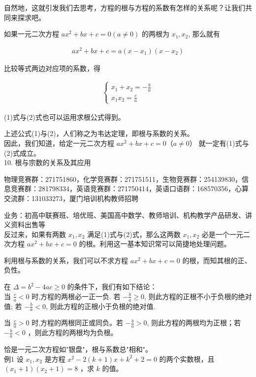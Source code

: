 \documentclass[10pt]{article}
\begin{document}
自然地，这就引发我们去思考，方程的根与方程的系数有怎样的关系呢？让我们共同来探求吧。

如果一元二次方程 $a x^{2}+b x+c=0(a \neq 0)$ 的两根为 $x_{1}, x_{2}$, 那么就有

\begin{align*}
a x^{2}+b x+c=a\left(x-x_{1}\right)\left(x-x_{2}\right)
\end{align*}

比较等式两边对应项的系数，得

\begin{align*}
\left\{\begin{array}{l}
x_{1}+x_{2}=-\frac{b}{a}  \tag{1}\\
x_{1} x_{2}=\frac{c}{a}
\end{array}\right.
\end{align*}

(1)式与(2)式也可以运用求根公式得到。

上述公式(1)与(2)，人们称之为韦达定理，即根与系数的关系。\\
因此，我们知道，给定一元二次方程 $a x^{2}+b x+c=0（a \neq 0）$ 就一定有(1)式与(2)式成立。\\
10. 根与宗数的关系及其应用

物理竞赛群：271751860，化学竞赛群：271751511，生物竞赛群：254139830，信息竞赛群：281798334，英语竞赛群：271750414，英语口语群：168570356，心算交流群：131033273，厦门培训机构教师招聘

业务：初高中联赛班、培优班、美国高中数学、教师培训、机构教学产品研发、讲义资料出售等\\
反过来，如果有两数 $x_{1}, x_{2}$ 满足(1)式与(2)式，那么这两数 $x_{1}, x_{2}$ 必是一个一元二次方程 $a x^{2}+b x+c=0$ 的根。利用这一基本知识常可以简捷地处理问题。

利用根与系数的关系，我们可以不求方程 $a x^{2}+b x+c=0$ 的根，而知其根的正、负性。

在 $\Delta=b^{2}-4 a c \geqslant 0$ 的条件下，我们有如下结论：\\
当 $\frac{c}{a}<0$ 时,方程的两根必一正一负. 若 $-\frac{b}{a} \geqslant 0$, 则此方程的正根不小于负根的绝对值; 若 $-\frac{b}{a}<0$, 则此方程的正根小于负根的绝对值.

当 $\frac{c}{a}>0$ 时,方程的两根同正或同负。若 $-\frac{b}{a}>0$, 则此方程的两根均为正根；若 $-\frac{b}{a}<0$ ，则此方程的两根均为负根。

恰是一元二次方程如"银盘"，根与系数总"相和"。\\
例1 设 $x_{1}, x_{2}$ 是方程 $x^{2}-2(k+1) x+k^{2}+2=0$ 的两个实数根，且 $\left(x_{1}+1\right)\left(x_{2}+1\right)=8$ ，求 $k$ 的值。
\end{document}
